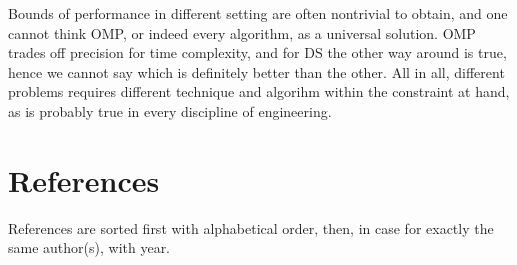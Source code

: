 \documentclass[12pt]{article}
\begin{document}
Bounds of performance in different setting are often nontrivial to obtain, and one cannot think OMP, or indeed every algorithm, as a universal solution.
OMP trades off precision for time complexity, and for DS the other way around is true, hence we cannot say which is definitely better than the other.
All in all, different problems requires different technique and algorihm within the constraint at hand, as is probably true in every discipline of engineering.

\section{References}

References are sorted first with alphabetical order, then, in case for exactly the same author(s), with year.
\end{document}
